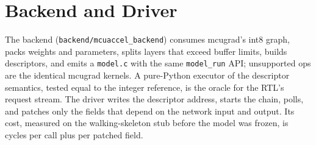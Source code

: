 \documentclass[conference]{IEEEtran}
\begin{document}
\section{Backend and Driver}\label{sec:backend}
The backend (\texttt{backend/mcuaccel\_backend}) consumes mcugrad's int8 graph, packs weights and parameters, splits layers that exceed buffer limits, builds descriptors, and emits a \texttt{model.c} with the same \texttt{model\_run} API; unsupported ops are the identical mcugrad kernels. A pure-Python executor of the descriptor semantics, tested equal to the integer reference, is the oracle for the RTL's request stream. The driver writes the descriptor address, starts the chain, polls, and patches only the fields that depend on the network input and output. Its cost, measured on the walking-skeleton stub before the model was frozen, is \DrvChain{} cycles per call plus \DrvPatch{} per patched field.
\end{document}
